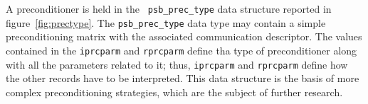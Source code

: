  A preconditioner is held in the \hypertarget{precdata}{{\tt
    psb\_prec\_type}} data structure reported in 
figure~\ref{fig:prectype}. The \verb|psb_prec_type| 
data type may contain a simple preconditioning matrix with the
associated communication descriptor.%
The values contained in
the \verb|iprcparm| and \verb|rprcparm| define tha type of
preconditioner along with all the parameters related to it; thus,
\verb|iprcparm| and \verb|rprcparm| define how the other records have
to be interpreted. This data structure is the basis of more complex
preconditioning strategies, which are the subject of further
research. 
